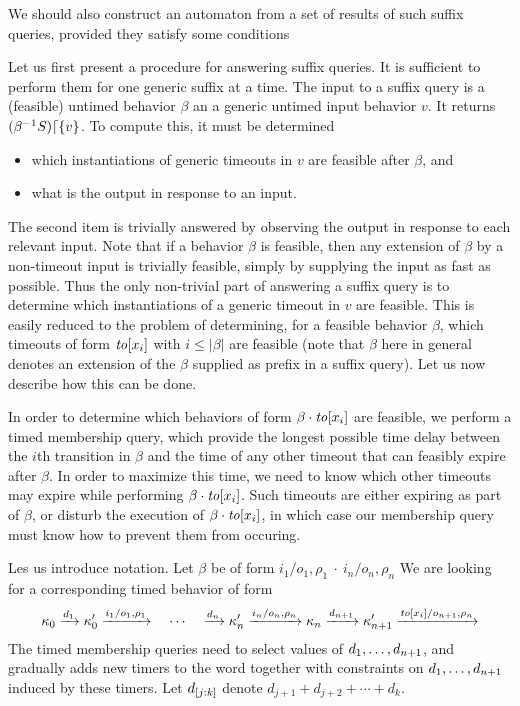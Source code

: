 We should also construct an automaton from a set of results of such
suffix queries, provided they satisfy some conditions

Let us first present a procedure for answering suffix queries. It is
sufficient to perform them for one generic suffix at a time.
The input to a suffix query is a (feasible) untimed behavior $\beta$ an a
generic untimed input behavior $v$. It returns
$({\beta}^{-1}{S})\lceil{\lbrace v\rbrace}$. To compute this, it must be determined
\begin{itemize}
\item which instantiations of generic timeouts in $v$ are feasible after $\beta$, and
\item what is the output in response to an input.
\end{itemize}
The second item is trivially answered by observing the output in response to
each relevant input. Note that if a behavior $\beta$ is feasible, then
any extension of $\beta$ by a non-timeout input is trivially feasible, simply
by supplying the input as fast as possible. Thus the only non-trivial part
of answering a suffix query is to determine which instantiations of a generic
timeout in $v$ are feasible. This is easily reduced to the problem of
determining, for a feasible behavior $\beta$, which timeouts of form
$\mathit{to}[x_i]$ with $i \leq |\beta|$ are feasible (note that $\beta$ here in
general denotes an extension of the $\beta$ supplied as prefix in a
suffix query). Let us now describe how this can be done.

In order to determine which behaviors of form $\beta \cdot \mathit{to}[x_i]$
are feasible, we perform a timed membership query, which provide the longest
possible time delay between the $i$th transition in $\beta$ and the time
of any other timeout that can feasibly expire after $\beta$. In order to
maximize this time, we need to know which other timeouts may expire while
performing $\beta \cdot \mathit{to}[x_i]$. Such timeouts are either expiring
as part of $\beta$, or disturb the execution of $\beta \cdot \mathit{to}[x_i]$,
in which case our membership query must know how to prevent them from occuring.

Les us introduce notation. Let $\beta$ be of form
\(
  {i_1/o_1, \rho_1} \ \cdot \ {i_n/o_n, \rho_n}
\)
We are looking for a corresponding timed behavior of form 
\[
\kappa_0 \xrightarrow{d_1} \kappa'_0 \xrightarrow{i_1/o_1, \rho_1}
\quad \cdots \quad
\xrightarrow{d_n} \kappa'_n \xrightarrow{i_n/o_n, \rho_n} \kappa_n
\xrightarrow{d_{n+1}} \kappa'_{n+1} \xrightarrow{\mathit{to}[x_i]/o_{n+1}, \rho_n}
\]
The timed membership queries need to select values
of ${d}_1 , \ldots , {d}_{n+1}$, and gradually adds new timers to the word together
with constraints on ${d}_1 , \ldots , {d}_{n+1}$ induced by these timers.
Let $d_{[j:k]}$ denote $d_{j+1} + d_{j+2} + \cdots + d_k$.

